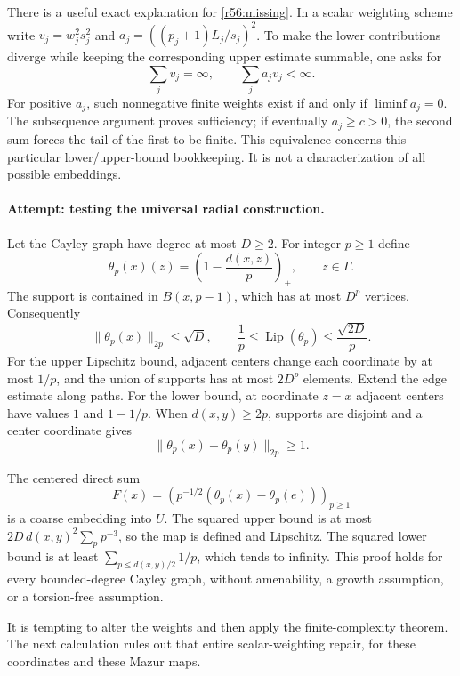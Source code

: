 \documentclass[11pt,a4paper]{article}
\numberwithin{equation}{section}
\begin{document}
There is a useful exact explanation for \eqref{r56:missing}. In a scalar weighting scheme write
$v_j=w_j^2s_j^2$ and $a_j=((p_j+1)L_j/s_j)^2$. To make the lower contributions diverge while keeping the corresponding upper estimate summable, one asks for
\begin{equation}\label{r56:weights}
 \sum_jv_j=\infty,\qquad \sum_ja_jv_j<\infty.
\end{equation}
For positive $a_j$, such nonnegative finite weights exist if and only if
$\liminf a_j=0$. The subsequence argument proves sufficiency; if eventually $a_j\geq c>0$, the second sum forces the tail of the first to be finite. This equivalence concerns this particular lower/upper-bound bookkeeping. It is not a characterization of all possible embeddings.

\paragraph{Attempt: testing the universal radial construction.}
Let the Cayley graph have degree at most $D\geq2$. For integer $p\geq1$ define
\[
 \theta_p(x)(z)=\left(1-\frac{d(x,z)}p\right)_+,
 \qquad z\in\Gamma.
\]
The support is contained in $B(x,p-1)$, which has at most $D^p$ vertices. Consequently
\begin{equation}\label{r56:radialbounds}
 \|\theta_p(x)\|_{2p}\leq\sqrt D,\qquad
 \frac1p\leq\operatorname{Lip}(\theta_p)
                   \leq\frac{\sqrt{2D}}p.
\end{equation}
For the upper Lipschitz bound, adjacent centers change each coordinate by at most $1/p$, and the union of supports has at most $2D^p$ elements. Extend the edge estimate along paths. For the lower bound, at coordinate $z=x$ adjacent centers have values $1$ and $1-1/p$. When $d(x,y)\geq2p$, supports are disjoint and a center coordinate gives
\begin{equation}\label{r56:separation}
 \|\theta_p(x)-\theta_p(y)\|_{2p}\geq1.
\end{equation}

The centered direct sum
\[
 F(x)=\left(p^{-1/2}(\theta_p(x)-\theta_p(e))\right)_{p\geq1}
\]
is a coarse embedding into $U$. The squared upper bound is at most
$2D\,d(x,y)^2\sum_pp^{-3}$, so the map is defined and Lipschitz. The squared lower bound is at least
$\sum_{p\leq d(x,y)/2}1/p$, which tends to infinity. This proof holds for every bounded-degree Cayley graph, without amenability, a growth assumption, or a torsion-free assumption.

It is tempting to alter the weights and then apply the finite-complexity theorem. The next calculation rules out that entire scalar-weighting repair, for these coordinates and these Mazur maps.
\end{document}
